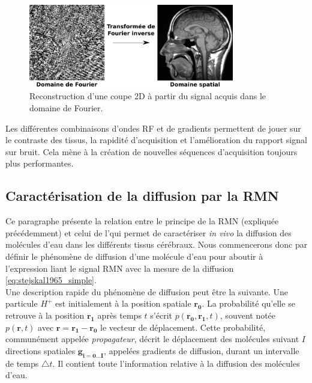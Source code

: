 \begin{figure}[ht]
    \centering
    \includegraphics[width=0.8\textwidth]{Images/reconstruction.pdf}
    \caption{\label{fig:reconstruction}Reconstruction d'une coupe 2D à partir du signal acquis dans le domaine de Fourier.}
\end{figure}
Les différentes combinaisons d'ondes RF et de gradients permettent de jouer sur le contraste des tissus, 
la rapidité d'acquisition et l'amélioration du rapport signal sur bruit. 
Cela mène à la création de nouvelles séquences d'acquisition toujours plus performantes.


\subsection{Caractérisation de la diffusion par la RMN}
Ce paragraphe présente la relation entre le principe de la RMN (expliquée précédemment) 
et celui de l'\irmd qui permet de caractériser \textit{in vivo} la diffusion des molécules d'eau dans les différents tissus cérébraux.
Nous commencerons donc par définir le phénomène de diffusion d'une molécule d'eau 
pour aboutir à l'expression liant le signal RMN avec la mesure de la diffusion \eqref{eq:stejskal1965_simple}.\\

Une description rapide du phénomène de diffusion peut être la suivante.
Une particule $H^+$ est initialement à la position spatiale $\mathbf{r_0}$.
La probabilité qu'elle se retrouve à la position $\mathbf{r_1}$ après temps $t$ s'écrit $p(\mathbf{r_0}, \mathbf{r_1}, t)$,
souvent notée $p(\mathbf{r}, t)$ avec $\mathbf{r}=\mathbf{r_1} - \mathbf{r_0}$ le vecteur de déplacement.
Cette probabilité, communément appelée \textit{propagateur}, décrit le
déplacement des molécules suivant $I$ directions spatiales $\mathbf{g_{i=0\dots I}}$, 
appelées gradients de diffusion, durant un intervalle de temps $\triangle t$.
Il contient toute l'information relative à la diffusion des molécules d'eau.

